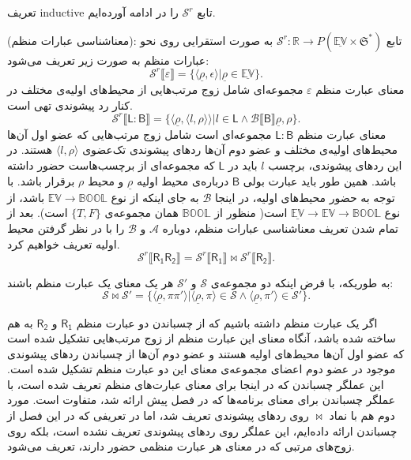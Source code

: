 تعریف \gls*{inductive} تابع 
$\mathcal{S}^r$
را در ادامه آورده‌ایم.
\begin{defn}
	(معناشناسی عبارات منظم):
	تابع 
	$\mathcal{S}^r:\mathbb{R}\rightarrow \mathit{P}(\mathbb{\underline{EV}\times \mathfrak{S}}^*)$
	به صورت استقرایی روی نحو عبارات منظم به صورت زیر تعریف می‌شود:
$$\mathcal{S}^r\llbracket\varepsilon\rrbracket= \{ \langle \underline{\rho} , \epsilon \rangle | \underline{\rho} \in \underline{\mathbb{EV}}\}.$$
معنای عبارت منظم
$\varepsilon$
مجموعه‌ای شامل زوج مرتب‌هایی از محیط‌های اولیه‌ی مختلف در کنار رد پیشوندی تهی است.
$$\mathcal{S}^r\llbracket\mathsf{L:B}\rrbracket = \{\langle\underline{\rho},\langle l , \rho \rangle \rangle | l \in \mathsf{L} \land \mathcal{B}\llbracket\mathsf{B}\rrbracket \underline{\rho},\rho \}.$$
معنای عبارت منظم
$\mathsf{L:B}$
مجموعه‌ای است شامل زوج مرتب‌هایی که عضو اول آن‌ها محیط‌های اولیه‌ی مختلف و عضو دوم آن‌ها ردهای پیشوندی تک‌عضوی 
$\langle l , \rho \rangle$
هستند. در این ردهای پیشوندی، برچسب 
$l$
باید در
$\mathsf{L}$
که مجموعه‌ای از برچسب‌هاست حضور داشته باشد. همین طور باید عبارت بولی 
$\mathsf{B}$
درباره‌ی محیط اولیه
$\underline{\rho}$
و محیط 
$\rho$
برقرار باشد. با توجه به حضور محیط‌های اولیه، در اینجا
$\mathcal{B}$
به جای اینکه از نوع 
$\mathbb{EV} \rightarrow \mathbb{BOOL}$
باشد، از نوع
$\underline{\mathbb{EV}} \rightarrow \mathbb{EV} \rightarrow \mathbb{BOOL}$
است( منظور از 
$\mathbb{BOOL}$
همان مجموعه‌ی 
$\{\mathit{T,F}\}$
است). بعد از تمام شدن تعریف معناشناسی عبارات منظم، دوباره
$\mathcal{A}$
و 
$\mathcal{B}$
را با در نظر گرفتن محیط اولیه تعریف خواهیم کرد.
$$\mathcal{S}^r\llbracket\mathsf{R_1 R_2}\rrbracket= \mathcal{S}^r\llbracket\mathsf{R_1}\rrbracket \Join \mathcal{S}^r\llbracket\mathsf{R_2}\rrbracket.$$
\begin{center}
	به ‌طوریکه، با فرض اینکه دو مجموعه‌ی 
	$\mathcal{S}$
	و
	$\mathcal{S'}$
	هر یک معنای یک عبارت منظم باشند:
$$\mathcal{S \Join S'}=
\{
\langle \underline{\rho}, \pi \pi' \rangle |
\langle \underline{\rho},\pi \rangle \in \mathcal{S} \land
\langle \underline{\rho},\pi' \rangle \in \mathcal{S'}
\}.
$$
\end{center}
اگر یک عبارت منظم داشته باشیم که از چسباندن دو عبارت منظم
$\mathsf{R_1}$
و 
$\mathsf{R_2}$
به هم ساخته شده باشد، آنگاه معنای این عبارت منظم از زوج مرتب‌هایی تشکیل شده است که عضو اول آن‌ها محیط‌های اولیه هستند و عضو دوم آن‌ها از چسباندن ردهای پیشوندی موجود در عضو دوم اعضای مجموعه‌ی معنای این دو عبارت منظم تشکیل شده است. این عملگر چسباندن که در اینجا برای معنای عبارت‌های منظم تعریف شده است، با عملگر چسباندن برای معنای برنامه‌ها که در فصل پیش ارائه شد، متفاوت است. مورد دوم هم با نماد $\Join$ روی ردهای پیشوندی تعریف ‌شد، اما در تعریفی که در این فصل از چسباندن ارائه داده‌ایم، این عملگر روی ردهای پیشوندی تعریف نشده است، بلکه روی زوج‌های مرتبی که در معنای هر عبارت منظمی حضور دارند، تعریف می‌شود.


\end{defn}
